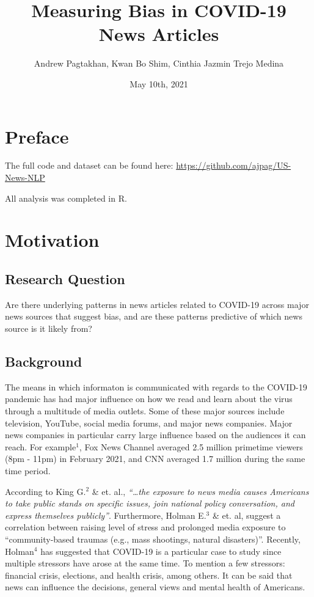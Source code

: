 \documentclass[
]{article}
\title{Measuring Bias in COVID-19 News Articles}
\author{Andrew Pagtakhan, Kwan Bo Shim, Cinthia Jazmin Trejo Medina}
\date{May 10th, 2021}
\begin{document}
\maketitle

{
\setcounter{tocdepth}{3}
\tableofcontents
}
\newpage

\hypertarget{preface}{%
\section{Preface}\label{preface}}

The full code and dataset can be found here:
\url{https://github.com/ajpag/US-News-NLP}

All analysis was completed in R.

\hypertarget{motivation}{%
\section{Motivation}\label{motivation}}

\hypertarget{research-question}{%
\subsection{Research Question}\label{research-question}}

Are there underlying patterns in news articles related to COVID-19
across major news sources that suggest bias, and are these patterns
predictive of which news source is it likely from?

\hypertarget{background}{%
\subsection{Background}\label{background}}

The means in which informaton is communicated with regards to the
COVID-19 pandemic has had major influence on how we read and learn about
the virus through a multitude of media outlets. Some of these major
sources include television, YouTube, social media forums, and major news
companies. Major news companies in particular carry large influence
based on the audiences it can reach. For example\(^{1}\), Fox News
Channel averaged 2.5 million primetime viewers (8pm - 11pm) in February
2021, and CNN averaged 1.7 million during the same time period.

According to King G.\(^{2}\) \& et. al., \emph{``\ldots the exposure to
news media causes Americans to take public stands on specific issues,
join national policy conversation, and express themselves publicly''}.
Furthermore, Holman E.\(^{3}\) \& et. al, suggest a correlation between
raising level of stress and prolonged media exposure to
``community-based traumas (e.g., mass shootings, natural disasters)''.
Recently, Holman\(^{4}\) has suggested that COVID-19 is a particular
case to study since multiple stressors have arose at the same time. To
mention a few stressors: financial crisis, elections, and health crisis,
among others. It can be said that news can influence the decisions,
general views and mental health of Americans.
\end{document}

